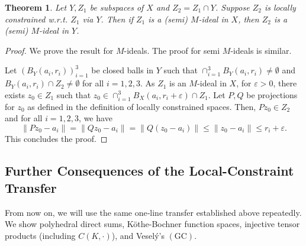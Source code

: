 \documentclass[11pt]{amsart}
\newtheorem{thm}{Theorem}[section]
\newcommand{\es}{\emptyset}
\newcommand{\e}{\varepsilon}
\begin{document}
\begin{thm}\label{T3}
Let $Y,Z_1$ be subspaces of $X$ and $Z_2=Z_1\cap Y$. Suppose $Z_2$ is locally constrained w.r.t. $Z_1$ via $Y$. Then if $Z_1$ is a (semi) $M$-ideal in $X$, then $Z_2$ is a (semi) $M$-ideal in $Y$.
\end{thm}
\begin{proof}
We prove the result for $M$-ideals. The proof for semi $M$-ideals is similar.

Let $(B_Y(a_i,r_i))_{i=1}^3$ be closed balls in $Y$ such that $\cap_{i=1}^3B_Y(a_i,r_i)\neq\es$ and $B_{Y}(a_i,r_i)\cap {Z_2}\neq\es$ for all $i=1,2,3$. As $Z_1$ is an $M$-ideal in $X$, for $\e>0$, there exists $z_0\in Z_1$ such that $z_0\in\cap_{i=1}^3B_X(a_i,r_i+\e)\cap Z_1$. Let $P,Q$ be projections for $z_0$ as defined in the definition of locally constrained spaces. Then, $Pz_0\in Z_2$ and for all $i=1,2,3$, we have
\[
\|Pz_0-a_i\|=\|Qz_0-a_i\|=\|Q(z_0-a_i)\|\leq\|z_0-a_i\|\leq r_i+\e.
\]
This concludes the proof.
\end{proof}


\subsection{Further Consequences of the Local-Constraint Transfer}
From now on, we will use the same one‑line transfer established above repeatedly. 
We show
polyhedral direct sums, K\"othe-Bochner function spaces, injective tensor
products (including $C(K,\cdot)$), and Vesel\'y's $(\mathrm{GC})$.
\end{document}
